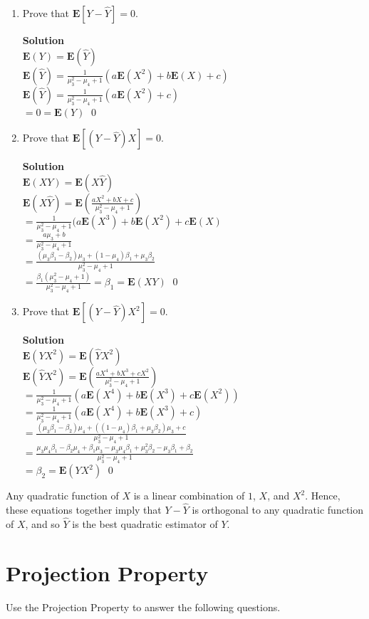 \documentclass[11pt]{article}
\newcommand*{\Question}[1]{\section{#1}}
\newenvironment{Parts}{\begin{enumerate}[label=(\alph*)]}{\end{enumerate}}
\newcommand*{\Part}{\item}
\newenvironment{Answer}{\vspace{10pt}\begin{mdframed}\textbf{Solution}\\}{\end{mdframed}\vfill\pagebreak[3]}
\newenvironment{Answer}{\vspace{10pt}}{\vfill\pagebreak[3]}
\newcommand*{\E}{\textbf{E}}
\begin{document}
\begin{Parts}
  \Part Prove that $\E[Y - \hat{Y}] = 0$.
  \begin{Answer}
$\E(Y)=\E(\hat{Y})$\\
$\E(\hat{Y})=\frac{1}{\mu_3^2-\mu_4+1}(a\E(X^2)+b\E(X)+c)$\\
$\E(\hat{Y})=\frac{1}{\mu_3^2-\mu_4+1}(a\E(X^2)+c)$\\
$=0=\E(Y)$ \qed

  \end{Answer}

  \Part Prove that $\E[(Y - \hat{Y})X] = 0$.
  \begin{Answer}
$\E(XY)=\E(X\hat{Y})$\\
$\E(X\hat{Y})=\E(\frac{aX^2+bX+c}{\mu_3^2-\mu_4+1})$\\
$=\frac{1}{\mu_3^2-\mu_4+1}(a\E(X^3)+b\E(X^2)+c\E(X)$\\
$=\frac{a\mu_3+b}{\mu_3^2-\mu_4+1}$\\
$=\frac{(\mu_3\beta_1-\beta_2)\mu_3+(1-\mu_4)\beta_1+\mu_3\beta_2}{\mu_3^2-\mu_4+1}$\\
$=\frac{\beta_1(\mu_3^2-\mu_4+1)}{\mu_3^2-\mu_4+1}=\beta_1=\E(XY)$ \qed
  \end{Answer}
  
  \Part Prove that $\E[(Y - \hat{Y})X^2] = 0$.
  \begin{Answer}
$\E(YX^2)=\E(\hat{Y}X^2)$\\
$\E(\hat{Y}X^2)=\E(\frac{aX^4+bX^3+cX^2}{\mu_3^2-\mu_4+1})$\\
$=\frac{1}{\mu_3^2-\mu_4+1}(a\E(X^4)+b\E(X^3)+c\E(X^2))$\\
$=\frac{1}{\mu_3^2-\mu_4+1}(a\E(X^4)+b\E(X^3)+c)$\\
$=\frac{(\mu_3\beta_1-\beta_2)\mu_4+((1-\mu_4)\beta_1+\mu_3\beta_2)\mu_3+c}{\mu_3^2-\mu_4+1}$\\
$=\frac{\mu_3\mu_4\beta_1-\beta_2\mu_4+\beta_1\mu_3-\mu_3\mu_4\beta_1+\mu_3^2\beta_2-\mu_3\beta_1+\beta_2}{\mu_3^2-\mu_4+1}$\\
$=\beta_2=\E(YX^2)$ \qed


  \end{Answer}  
\end{Parts}
Any quadratic function of $X$ is a linear combination of $1$, $X$, and $X^2$. Hence, these equations together imply that $Y - \hat{Y}$ is orthogonal to any quadratic function of $X$, and so $\hat{Y}$ is the best quadratic estimator of $Y$.


\Question{Projection Property}

Use the Projection Property to answer the following questions.
\end{document}

